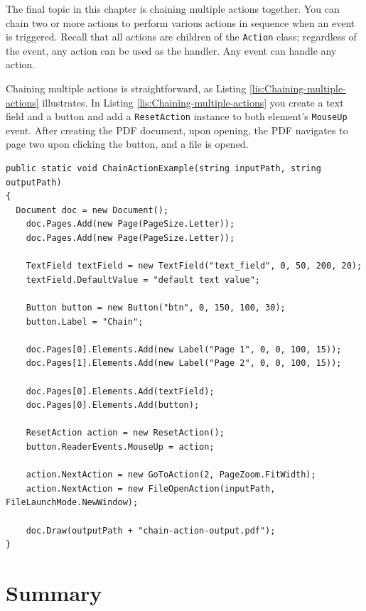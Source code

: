 \documentclass[american]{tufte-book}
\numberwithin{equation}{section}
\numberwithin{figure}{section}
\begin{document}
{{The final topic in this chapter is chaining multiple actions together.
You can chain two or more actions to perform various actions in sequence
when an event is triggered. Recall that all actions are children of
the \texttt{Action} class; regardless of the event, any action can be used
as the handler. Any event can handle any action.

Chaining multiple actions is straightforward, as Listing \ref{lis:Chaining-multiple-actions}
illustrates. In Listing \ref{lis:Chaining-multiple-actions} you create
a text field and a button and add a \texttt{ResetAction} instance
to both element's \texttt{MouseUp} event. After creating the PDF document,
upon opening, the PDF navigates to page two upon clicking the button,
and a file is opened. 

\bgroup{}
\begin{lstlisting}[caption={Chaining multiple actions in a PDF document.},label={lis:Chaining-multiple-actions},basicstyle={\footnotesize\ttfamily},breaklines=true]
public static void ChainActionExample(string inputPath, string outputPath)
{
  Document doc = new Document();
    doc.Pages.Add(new Page(PageSize.Letter));
    doc.Pages.Add(new Page(PageSize.Letter));

    TextField textField = new TextField("text_field", 0, 50, 200, 20);
    textField.DefaultValue = "default text value";

    Button button = new Button("btn", 0, 150, 100, 30);
    button.Label = "Chain";

    doc.Pages[0].Elements.Add(new Label("Page 1", 0, 0, 100, 15));
    doc.Pages[1].Elements.Add(new Label("Page 2", 0, 0, 100, 15));

    doc.Pages[0].Elements.Add(textField);
    doc.Pages[0].Elements.Add(button);

    ResetAction action = new ResetAction();
    button.ReaderEvents.MouseUp = action;

    action.NextAction = new GoToAction(2, PageZoom.FitWidth);
    action.NextAction = new FileOpenAction(inputPath, FileLaunchMode.NewWindow);

    doc.Draw(outputPath + "chain-action-output.pdf");
}
\end{lstlisting}
\leavevmode\egroup


\section{Summary}

}}
\end{document}
